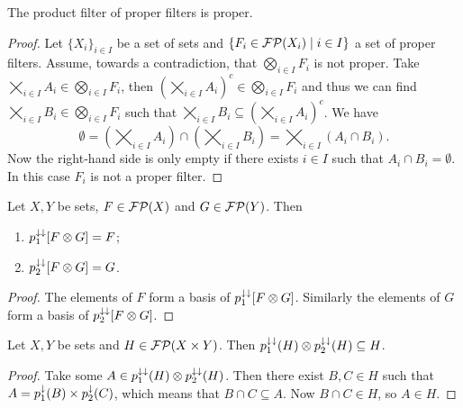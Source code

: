 \begin{lemma}
The product filter of proper filters is proper.
\end{lemma}
\begin{proof}
Let $\{X_i\}_{i\in I}$ be a set of sets and $\left\{ F_i \in \operatorname{\mathcal{FP}}(X_i) \;\middle|\; i\in I \right\}$ a set of proper filters. Assume, towards a contradiction, that $\bigotimes_{i\in I}F_i$ is not proper. Take $\bigtimes_{i\in I}A_i\in \bigotimes_{i\in I}F_i$, then $\left(\bigtimes_{i\in I}A_i\right)^c \in \bigotimes_{i\in I}F_i$ and thus we can find $\bigtimes_{i\in I}B_i\in \bigotimes_{i\in I}F_i$ such that $\bigtimes_{i\in I}B_i \subseteq \left(\bigtimes_{i\in I}A_i\right)^c$. We have
\[ \emptyset = \left(\bigtimes_{i\in I}A_i\right) \cap \left(\bigtimes_{i\in I}B_i\right) = \bigtimes_{i\in I}(A_i\cap B_i). \]
Now the right-hand side is only empty if there exists $i\in I$ such that $A_i\cap B_i = \emptyset$. In this case $F_i$ is not a proper filter.
\end{proof}

\begin{lemma} \label{projectionsOfProductFilter}
Let $X,Y$ be sets, $F\in \operatorname{\mathcal{FP}}(X)$ and $G\in \operatorname{\mathcal{FP}}(Y)$. Then
\begin{enumerate}
\item $p_1^{\downarrow\downarrow}[F\otimes G] = F$;
\item $p_2^{\downarrow\downarrow}[F\otimes G] = G$.
\end{enumerate}
\end{lemma}
\begin{proof}
The elements of $F$ form a basis of $p_1^{\downarrow\downarrow}[F\otimes G]$. Similarly the elements of $G$ form a basis of $p_2^{\downarrow\downarrow}[F\otimes G]$.
\end{proof}

\begin{lemma} \label{filterFactorisationInequality}
Let $X,Y$ be sets and $H \in \operatorname{\mathcal{FP}}(X\times Y)$. Then $p_1^{\downarrow\downarrow}(H)\otimes p_2^{\downarrow\downarrow}(H) \subseteq H$.
\end{lemma}
\begin{proof}
Take some $A\in p_1^{\downarrow\downarrow}(H)\otimes p_2^{\downarrow\downarrow}(H)$. Then there exist $B,C\in H$ such that $A = p_1^\downarrow(B)\times p_2^\downarrow(C)$, which means that $B\cap C\subseteq A$. Now $B\cap C \in H$, so $A\in H$.
\end{proof}

